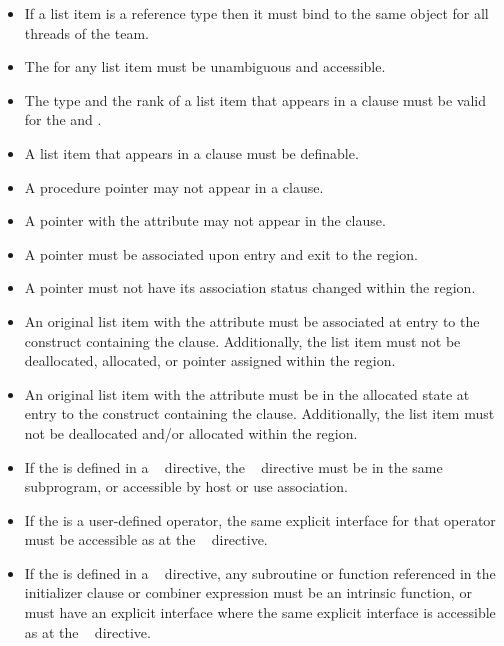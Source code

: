 \begin{itemize}
\item If a list item is a reference type then it must bind to the same object for all threads of 
the team.

\item The  for any list item must be unambiguous and accessible.
\ccppspecificend
\bigskip

\fortranspecificstart
\item The type and the rank of a list item that appears in a  clause must be valid for the  and .

\item A list item that appears in a  clause must be definable.

\item A procedure pointer may not appear in a  clause.

\item A pointer with the  attribute may not appear in the  
clause. 

\item A pointer must be associated upon entry and exit to the region. 

\item A pointer must not have its association status changed within the region. 

\item An original list item with the  attribute must be associated at entry to the 
construct containing the  clause. Additionally, the list item must not be 
deallocated, allocated, or pointer assigned within the region.

\item An original list item with the  attribute must be in the allocated state 
at entry to the construct containing the  clause. Additionally, the list 
item must not be deallocated and/or allocated within the region. 

\item If the  is defined in a ~ directive, the 
~ directive must be in the same subprogram, or accessible by 
host or use association.

\item If the  is a user-defined operator, the same explicit interface for 
that operator must be accessible as at the ~ directive.

\item If the  is defined in a ~ directive, any 
subroutine or function referenced in the initializer clause or combiner expression 
must be an intrinsic function, or must have an explicit interface where the same 
explicit interface is accessible as at the ~ directive.
\fortranspecificend
\end{itemize}










